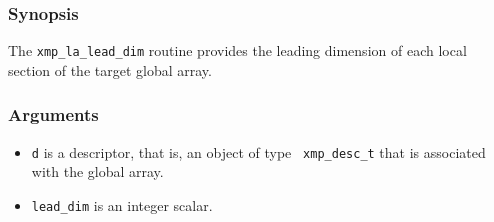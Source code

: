 \subsubsection*{Synopsis}

The {\tt xmp\_la\_lead\_dim} routine provides the leading dimension of
each local section of the target global array.

\subsubsection*{Arguments}

\begin{itemize}
 \item {\tt d} is a descriptor, that is, an object of type {\tt
       xmp\_desc\_t} that is associated with the global array.
 \item {\tt lead\_dim} is an integer scalar.
\end{itemize}


%
%
%
%
%
%
%
%
%


